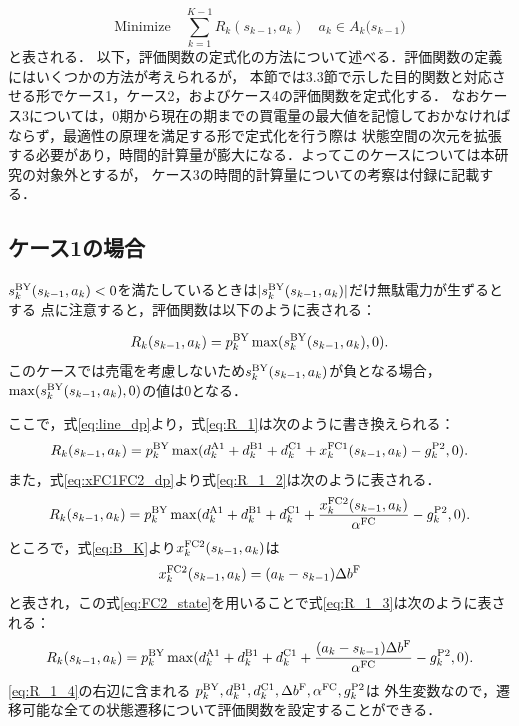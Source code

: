 	\begin{equation}
		\text{Minimize} \quad  \sum_{k=1}^{K-1} R_k(s_{k-1},a_{k}) \quad  a_{k}\in A_k({s_{k-1})}
 	\label{eq:minimize_dp}
	\end{equation}
	と表される．
	以下，評価関数の定式化の方法について述べる．評価関数の定義にはいくつかの方法が考えられるが，
	本節では3.3節で示した目的関数と対応させる形でケース1，ケース2，およびケース4の評価関数を定式化する．
	なおケース3については，0期から現在の期までの買電量の最大値を記憶しておかなければならず，最適性の原理を満足する形で定式化を行う際は
	状態空間の次元を拡張する必要があり，時間的計算量が膨大になる．よってこのケースについては本研究の対象外とするが，
	ケース3の時間的計算量についての考察は付録に記載する．

\subsection{ケース1の場合}\label{sec:R}
	$s^{\rm BY}_{k}(s_{k-1},a_{k}) < 0$を満たしているときは$|s^{\rm BY}_{k}(s_{k-1},a_{k})|$だけ無駄電力が生ずるとする
	点に注意すると，評価関数は以下のように表される：

	\begin{equation}
		R_k(s_{k-1},a_{k}) = p_k^{\rm BY} \max (s_k^{\rm BY}(s_{k-1},a_{k}) , 0).
 		\label{eq:R_1}
	\end{equation}	
	このケースでは売電を考慮しないため$s_k^{\rm BY}(s_{k-1},a_{k})$が負となる場合，
	$\max (s_k^{\rm BY}(s_{k-1},a_{k}) , 0)$の値は0となる．
	
	ここで，式\eqref{eq:line_dp}より，式\eqref{eq:R_1}は次のように書き換えられる：
	\begin{equation}
		R_k(s_{k-1},a_{k}) = p_k^{\rm BY} \max (d_k^{\rm A1}+ d_k^{\rm B1} + d_k^{\rm C1}+  x_k^{\rm FC1}(s_{k-1},a_{k}) - g_k^{\rm P2} , 0).
 		\label{eq:R_1_2}
	\end{equation}	
	また，式\eqref{eq:xFC1FC2_dp}より式\eqref{eq:R_1_2}は次のように表される．
	\begin{equation}
		R_k(s_{k-1},a_{k}) = p_k^{\rm BY} \max (d_k^{\rm A1}+ d_k^{\rm B1} + d_k^{\rm C1}+  \frac{x_k^{\rm FC2}(s_{k-1},a_{k})}{\alpha^{\rm FC}} - g_k^{\rm P2} , 0).
 		\label{eq:R_1_3}
	\end{equation}	
	ところで，式\eqref{eq:B_K}より$x_k^{\rm FC2}(s_{k-1},a_{k})$は
	\begin{equation}
		x_k^{\rm FC2}(s_{k-1},a_{k}) = (a_{k} - s_{k-1})\Delta b^{\rm F}
		\label{eq:FC2_state}
	\end{equation}
	と表され，この式\eqref{eq:FC2_state}を用いることで式\eqref{eq:R_1_3}は次のように表される：
	\begin{equation}
		R_k(s_{k-1},a_{k}) = p_k^{\rm BY} \max (d_k^{\rm A1}+ d_k^{\rm B1} + d_k^{\rm C1}+  \frac{(a_{k} - s_{k-1})\Delta b^{\rm F}}{\alpha^{\rm FC}} - g_k^{\rm P2} , 0).
 		\label{eq:R_1_4}
	\end{equation}		
	\eqref{eq:R_1_4}の右辺に含まれる $p_k^{\rm BY},d_k^{\rm B1},d_k^{\rm C1},\Delta b^{\rm F},\alpha^{\rm FC},g_k^{\rm P2}$は
	外生変数なので，遷移可能な全ての状態遷移について評価関数を設定することができる．
	
